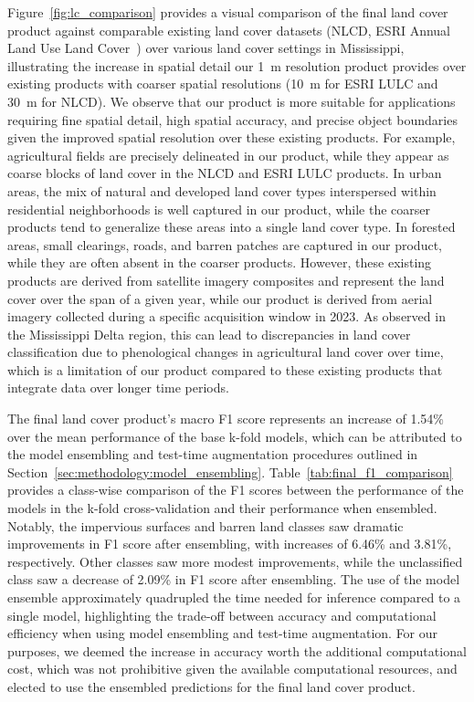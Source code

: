 Figure~\ref{fig:lc_comparison} provides a visual comparison of the final land cover product against comparable existing land cover datasets (NLCD, ESRI Annual Land Use Land Cover~\citep{karraGlobalLandUse2021}) over various land cover settings in Mississippi, illustrating the increase in spatial detail our \SI{1}{\meter} resolution product provides over existing products with coarser spatial resolutions (\SI{10}{\meter} for ESRI LULC and \SI{30}{\meter} for NLCD).
We observe that our product is more suitable for applications requiring fine spatial detail, high spatial accuracy, and precise object boundaries given the improved spatial resolution over these existing products.
For example, agricultural fields are precisely delineated in our product, while they appear as coarse blocks of land cover in the NLCD and ESRI LULC products.
In urban areas, the mix of natural and developed land cover types interspersed within residential neighborhoods is well captured in our product, while the coarser products tend to generalize these areas into a single land cover type.
In forested areas, small clearings, roads, and barren patches are captured in our product, while they are often absent in the coarser products.
However, these existing products are derived from satellite imagery composites and represent the land cover over the span of a given year, while our product is derived from aerial imagery collected during a specific acquisition window in 2023.
As observed in the Mississippi Delta region, this can lead to discrepancies in land cover classification due to phenological changes in agricultural land cover over time, which is a limitation of our product compared to these existing products that integrate data over longer time periods.




The final land cover product's macro F1 score represents an increase of \num{1.54}\% over the mean performance of the base k-fold models, which can be attributed to the model ensembling and test-time augmentation procedures outlined in Section~\ref{sec:methodology:model_ensembling}.
Table~\ref{tab:final_f1_comparison} provides a class-wise comparison of the F1 scores between the performance of the models in the k-fold cross-validation and their performance when ensembled.
Notably, the impervious surfaces and barren land classes saw dramatic improvements in F1 score after ensembling, with increases of \num{6.46}\% and \num{3.81}\%, respectively.
Other classes saw more modest improvements, while the unclassified class saw a decrease of \num{2.09}\% in F1 score after ensembling.
The use of the model ensemble approximately quadrupled the time needed for inference compared to a single model, highlighting the trade-off between accuracy and computational efficiency when using model ensembling and test-time augmentation.
For our purposes, we deemed the increase in accuracy worth the additional computational cost, which was not prohibitive given the available computational resources, and elected to use the ensembled predictions for the final land cover product.

